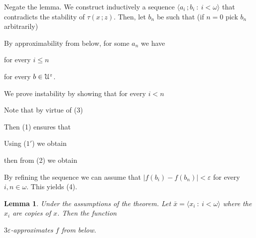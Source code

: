 \documentclass{amsproc}
\makeatletter
\newcounter{thm}
\theoremstyle{mio}
\newtheorem{lemma}[thm]{Lemma}\tcolorboxenvironment{lemma}{mythm}
\providecommand{\proofNameStyle}{\bfseries}
\renewenvironment{proof}[1][\proofname]{\par
  \pushQED{\qed}%
  \normalfont%
  \trivlist
  \item[\hskip\labelsep
        \proofNameStyle
    #1\@addpunct{.}]\ignorespaces
}{%
  \popQED\endtrivlist\@endpefalse
}
\makeatother
\begin{document}
\begin{proof}
  Negate the lemma.
  We construct inductively a sequence $\langle a_i\,;b_i\ :\ i<\omega\rangle$ that contradicts the stability of $\tau(x\,;z)$.
  Then, let $b_n$ be such that (if $n=0$ pick $b_n$ arbitrarily)


  By approximability from below, for some $a_n$ we have

  \hfill for every $i\le n$

  \hfill for every $b\in{\EuScript U}^{z}$.

  We prove instability by showing that for every $i<n$


  Note that by virtue of (3) 


  Then (1) ensures that


  Using ($1'$) we obtain


  then from (2) we obtain


  By refining the sequence we can assume that $|f(b_i)-f(b_n)|<\varepsilon$ for every $i,n\in\omega$.
  This yields (4).
\end{proof}

\begin{lemma}
  Under the assumptions of the theorem. 
  Let $\bar x=\langle x_i\ :\ i<\omega\rangle$ where the $x_i$ are copies of $x$.
  Then the function\smallskip


  $3\varepsilon$-approximates $f$ from below.
\end{lemma}
\end{document}
